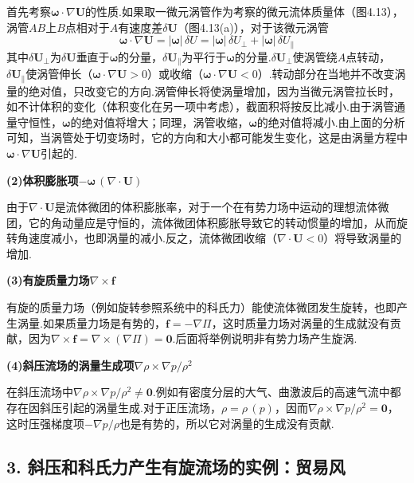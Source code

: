 首先考察$\boldsymbol{\omega}\cdot\nabla\boldsymbol{U}$的性质.如果取一微元涡管作为考察的微元流体质量体（图4.13），涡管$AB$上$B$点相对于$A$有速度差$\delta\boldsymbol{U}$（图4.13(a)），对于该微元涡管
\[
\boldsymbol{\omega}\cdot\nabla\boldsymbol{U}=|\boldsymbol{\omega}|\,\delta U=|\boldsymbol{\omega}|\,\delta U_\perp+|\boldsymbol{\omega}|\,\delta U_\parallel
\]
其中$\delta\boldsymbol{U}_\perp$为$\delta\boldsymbol{U}$垂直于$\boldsymbol{\omega}$的分量，$\delta\boldsymbol{U}_\parallel$为平行于$\boldsymbol{\omega}$的分量.$\delta\boldsymbol{U}_\perp$使涡管绕$A$点转动，$\delta\boldsymbol{U}_\parallel$使涡管伸长（$\boldsymbol{\omega}\cdot\nabla\boldsymbol{U}>0$）或收缩（$\boldsymbol{\omega}\cdot\nabla\boldsymbol{U}<0$）.转动部分在当地并不改变涡量的绝对值，只改变它的方向.涡管伸长将使涡量增加，因为当微元涡管拉长时，如不计体积的变化（体积变化在另一项中考虑），截面积将按反比减小.由于涡管通量守恒性，$\boldsymbol{\omega}$的绝对值将增大；同理，涡管收缩，$\boldsymbol{\omega}$的绝对值将减小.由上面的分析可知，当涡管处于切变场时，它的方向和大小都可能发生变化，这是由涡量方程中$\boldsymbol{\omega}\cdot\nabla\boldsymbol{U}$引起的.

\textbf{(2)体积膨胀项$-\boldsymbol{\omega}\,(\nabla\cdot\boldsymbol{U})$}

由于$\nabla\cdot\boldsymbol{U}$是流体微团的体积膨胀率，对于一个在有势力场中运动的理想流体微团，它的角动量应是守恒的，流体微团体积膨胀导致它的转动惯量的增加，从而旋转角速度减小，也即涡量的减小.反之，流体微团收缩（$\nabla\cdot\boldsymbol{U}<0$）将导致涡量的增加.

\textbf{(3)有旋质量力场$\nabla\times\boldsymbol{f}$}

有旋的质量力场（例如旋转参照系统中的科氏力）能使流体微团发生旋转，也即产生涡量.如果质量力场是有势的，$\boldsymbol{f}=-\nabla\Pi$，这时质量力场对涡量的生成就没有贡献，因为$\nabla\times\boldsymbol{f}=\nabla\times(\nabla\Pi)=\boldsymbol{0}$.后面将举例说明非有势力场产生旋涡.

\textbf{(4)斜压流场的涡量生成项$\nabla\rho\times\nabla p/\rho^{2}$}

在斜压流场中$\nabla\rho\times\nabla p/\rho^{2}\neq\boldsymbol{0}$.例如有密度分层的大气、曲激波后的高速气流中都存在因斜压引起的涡量生成.对于正压流场，$\rho=\rho\,(p)$，因而$\nabla\rho\times\nabla p/\rho^{2}=\boldsymbol{0}$，这时压强梯度项$-\nabla p/\rho$也是有势的，所以它对涡量的生成没有贡献.

\subsection*{3. 斜压和科氏力产生有旋流场的实例：贸易风}

